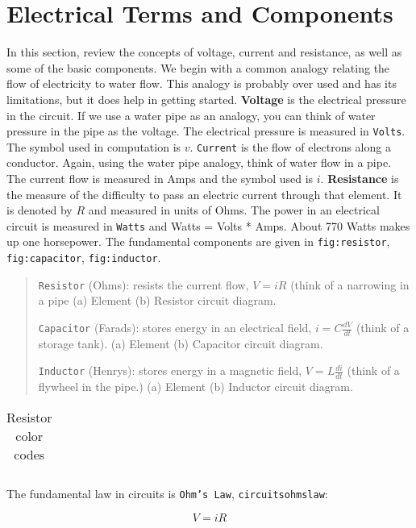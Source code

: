 \hypertarget{electrical-terms-and-components}{%
\section{Electrical Terms and
Components}\label{electrical-terms-and-components}}

In this section, review the concepts of voltage, current and resistance,
as well as some of the basic components. We begin with a common analogy
relating the flow of electricity to water flow. This analogy is probably
over used and has its limitations, but it does help in getting started.
\textbf{Voltage} is the electrical pressure in the circuit. If we use a
water pipe as an analogy, you can think of water pressure in the pipe as
the voltage. The electrical pressure is measured in \texttt{Volts}. The
symbol used in computation is \(v\). \texttt{Current} is the flow of
electrons along a conductor. Again, using the water pipe analogy, think
of water flow in a pipe. The current flow is measured in Amps and the
symbol used is \(i\). \textbf{Resistance} is the measure of the
difficulty to pass an electric current through that element. It is
denoted by \(R\) and measured in units of Ohms. The power in an
electrical circuit is measured in \texttt{Watts} and Watts = Volts *
Amps. About 770 Watts makes up one horsepower. The fundamental
components are given in \texttt{fig:resistor}, \texttt{fig:capacitor},
\texttt{fig:inductor}.

\begin{quote}
\texttt{Resistor} (Ohms): resists the current flow, \(V = iR\) (think of
a narrowing in a pipe (a) Element (b) Resistor circuit diagram.

\texttt{Capacitor} (Farads): stores energy in an electrical field,
\(i = \displaystyle C\frac{dV}{dt}\) (think of a storage tank). (a)
Element (b) Capacitor circuit diagram.

\texttt{Inductor} (Henrys): stores energy in a magnetic field,
\(V = \displaystyle L\frac{di}{dt}\) (think of a flywheel in the pipe.)
(a) Element (b) Inductor circuit diagram.
\end{quote}

\begin{longtable}[]{@{}@{}}
\caption{Resistor color codes}\tabularnewline
\toprule
\endhead
\bottomrule
\end{longtable}

The fundamental law in circuits is \texttt{Ohm’s\ Law},
\texttt{circuitsohmslaw}:

\[V = iR\]

